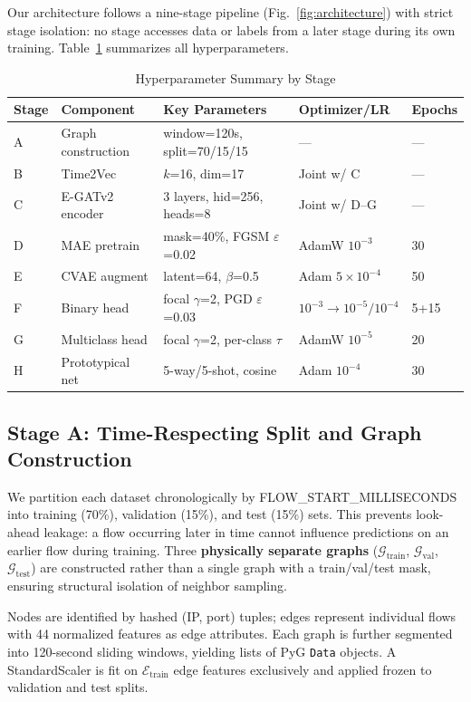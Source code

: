 \documentclass[compsoc,journal]{IEEEtran}
\begin{document}
Our architecture follows a nine-stage pipeline (Fig.~\ref{fig:architecture}) with strict stage isolation: no stage accesses data or labels from a later stage during its own training. Table~\ref{tab:hyperparameters} summarizes all hyperparameters.

\begin{table}[t]
\centering
\caption{Hyperparameter Summary by Stage}
\label{tab:hyperparameters}
\begin{tabular}{lllll}
\toprule
\textbf{Stage} & \textbf{Component} & \textbf{Key Parameters} & \textbf{Optimizer/LR} & \textbf{Epochs} \\
\midrule
A & Graph construction & window=120s, split=70/15/15 & — & — \\
B & Time2Vec & $k$=16, dim=17 & Joint w/ C & — \\
C & E-GATv2 encoder & 3 layers, hid=256, heads=8 & Joint w/ D–G & — \\
D & MAE pretrain & mask=40\%, FGSM $\varepsilon$=0.02 & AdamW $10^{-3}$ & 30 \\
E & CVAE augment & latent=64, $\beta$=0.5 & Adam $5\times10^{-4}$ & 50 \\
F & Binary head & focal $\gamma$=2, PGD $\varepsilon$=0.03 & $10^{-3} \rightarrow 10^{-5}/10^{-4}$ & 5+15 \\
G & Multiclass head & focal $\gamma$=2, per-class $\tau$ & AdamW $10^{-5}$ & 20 \\
H & Prototypical net & 5-way/5-shot, cosine & Adam $10^{-4}$ & 30 \\
\bottomrule
\end{tabular}
\end{table}

\subsection{Stage A: Time-Respecting Split and Graph Construction}

We partition each dataset chronologically by FLOW\_START\_MILLISECONDS into training (70\%), validation (15\%), and test (15\%) sets. This prevents look-ahead leakage: a flow occurring later in time cannot influence predictions on an earlier flow during training. Three \textbf{physically separate graphs} ($\mathcal{G}_{\text{train}}$, $\mathcal{G}_{\text{val}}$, $\mathcal{G}_{\text{test}}$) are constructed rather than a single graph with a train/val/test mask, ensuring structural isolation of neighbor sampling.

Nodes are identified by hashed (IP, port) tuples; edges represent individual flows with 44 normalized features as edge attributes. Each graph is further segmented into 120-second sliding windows, yielding lists of PyG \texttt{Data} objects. A StandardScaler is fit on $\mathcal{E}_{\text{train}}$ edge features exclusively and applied frozen to validation and test splits.
\end{document}

